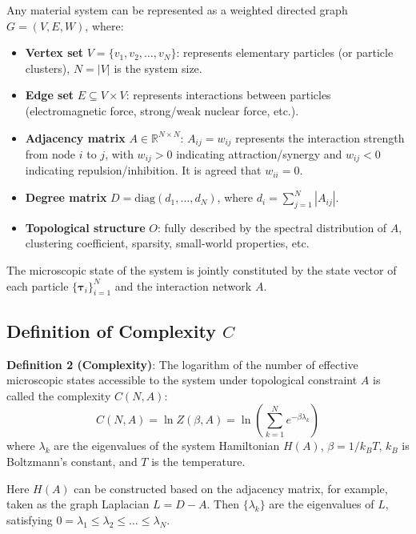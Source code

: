 \documentclass[12pt,a4paper]{article}
\theoremstyle{plain}
\newcommand{\ve}[1]{\bm{#1}}                    %
\begin{document}
Any material system can be represented as a weighted directed graph $G=(V,E,W)$, where:
\begin{itemize}
    \item \textbf{Vertex set} $V = \{v_1, v_2, \dots, v_N\}$: represents elementary particles (or particle clusters), $N = |V|$ is the system size.
    \item \textbf{Edge set} $E \subseteq V \times V$: represents interactions between particles (electromagnetic force, strong/weak nuclear force, etc.).
    \item \textbf{Adjacency matrix} $A \in \mathbb{R}^{N \times N}$: $A_{ij} = w_{ij}$ represents the interaction strength from node $i$ to $j$, with $w_{ij}>0$ indicating attraction/synergy and $w_{ij}<0$ indicating repulsion/inhibition. It is agreed that $w_{ii}=0$.
    \item \textbf{Degree matrix} $D = \text{diag}(d_1, \dots, d_N)$, where $d_i = \sum_{j=1}^N |A_{ij}|$.
    \item \textbf{Topological structure} $O$: fully described by the spectral distribution of $A$, clustering coefficient, sparsity, small-world properties, etc.
\end{itemize}

The microscopic state of the system is jointly constituted by the state vector of each particle $\{\ve{\tau}_i\}_{i=1}^N$ and the interaction network $A$.

\subsection{Definition of Complexity $C$}

\textbf{Definition 2 (Complexity)}: The logarithm of the number of effective microscopic states accessible to the system under topological constraint $A$ is called the complexity $C(N,A)$:
\begin{equation}
C(N,A) = \ln Z(\beta, A) = \ln\left( \sum_{k=1}^N e^{-\beta \lambda_k} \right)
\end{equation}
where $\lambda_k$ are the eigenvalues of the system Hamiltonian $H(A)$, $\beta = 1/k_B T$, $k_B$ is Boltzmann's constant, and $T$ is the temperature.

Here $H(A)$ can be constructed based on the adjacency matrix, for example, taken as the graph Laplacian $L = D - A$. Then $\{\lambda_k\}$ are the eigenvalues of $L$, satisfying $0 = \lambda_1 \leq \lambda_2 \leq \dots \leq \lambda_N$.
\end{document}
